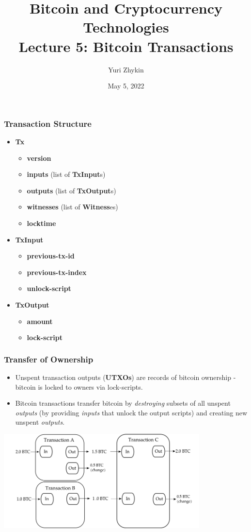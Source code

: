 \documentclass{beamer}
\title{
  Bitcoin and Cryptocurrency Technologies \\
  Lecture 5: Bitcoin Transactions
}
\author{Yuri Zhykin}
\date{May 5, 2022}
\begin{document}
\frame{\titlepage}

\begin{frame}
  \frametitle{Transaction Structure}
  \begin{itemize}
  \item \textbf{Tx}
    \begin{itemize}
    \item \textbf{version}
    \item \textbf{inputs} (list of \textbf{TxInput}s)
    \item \textbf{outputs} (list of \textbf{TxOutput}s)
    \item \textbf{witnesses} (list of \textbf{Witness}es)
    \item \textbf{locktime}
    \end{itemize}
  \item \textbf{TxInput}
    \begin{itemize}
    \item \textbf{previous-tx-id}
    \item \textbf{previous-tx-index}
    \item \textbf{unlock-script}
    \end{itemize}
  \item \textbf{TxOutput}
    \begin{itemize}
    \item \textbf{amount}
    \item \textbf{lock-script}
    \end{itemize}
  \end{itemize}
\end{frame}

\begin{frame}[fragile]
  \frametitle{Transfer of Ownership}
  \begin{itemize}
  \item Unspent transaction outputs (\textbf{UTXOs}) are records of bitcoin
    ownership - bitcoin is locked to owners via lock-scripts.
  \item Bitcoin transactions transfer bitcoin by \textit{destroying} subsets of
    all unspent \textit{outputs} (by providing \textit{inputs} that unlock the
    output scripts) and creating new unspent \textit{outputs}.
  \end{itemize}
  \begin{center}
    \includegraphics[width=0.8\textwidth]{transactions}
  \end{center}
\end{frame}
\end{document}
